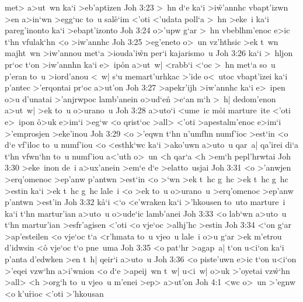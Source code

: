 met>
a>ut~wn
ka`i
>eb'aptizen\bibvsend
\vs Joh 3:23
>~hn
d`e
ka`i
>i\r{w}'annhc
vbapt'izwn
>en
a>in`wn
>egg`uc
to~u
sal\r{e}`im
<'oti
<'udata
poll`a
>~hn
>eke~i
ka`i
pareg'inonto
ka`i
>ebapt'izonto\bibvsend
\vs Joh 3:24
o>'upw
g`ar
>~hn
vbeblhm'enoc
e>ic
t`hn
vfulak`hn
<o
>iw'annhc\bibvsend
\vs Joh 3:25
>eg'eneto
o>~un
vz'hthsic
>ek
t~wn
majht~wn
>iw'annou
met`a
>iouda'i\r{w}n
per`i
kajarismo~u\bibvsend
\vs Joh 3:26
ka`i
>~hljon
pr`oc
t`on
>iw'annhn
ka`i
e>~ip\r{o}n
a>ut~w|
<rabb`i
<`oc
>~hn
met`a
so~u
p'eran
to~u
>iord'anou
<~w|
s`u
memart'urhkac
>'ide
o<~utoc
vbapt'izei
ka`i
p'antec
>'erqontai
pr`oc
a>ut'on\bibvsend
\vs Joh 3:27
>apekr'ijh
>iw'annhc
ka`i
e>~ipen
o>u
d'unatai
>'anjrwpoc
lamb'anein
o>ud`e\r{n}
>e`an
m`h
>~h|
dedom'enon
a>ut~w|
>ek
to~u
o>urano~u\bibvsend
\vs Joh 3:28
a>uto`i
<ume~ic
m\r{o}i
marture~ite
<'oti
e>~ipon
\r{o}>uk
e>im`i
>eg`w
<o
qrist`oc
>all>
<'oti
>apestalm'enoc
e>im`i
>'emprosjen
>eke'inou\bibvsend
\vs Joh 3:29
<o
>'eqwn
t`hn
n'umfhn
numf'ioc
>est`in
<o
d`e
vf'iloc
to~u
numf'iou
<o
<esthk`wc
ka`i
>ako'uwn
a>uto~u
qar~a|
qa'irei
di`a
t`hn
vfwn`hn
to~u
numf'iou
a<'uth
o>~un
<h
qar`a
<h
>em`h
pepl'hrwtai\bibvsend
\vs Joh 3:30
>eke~inon
de~i
a>ux'anein
>em`e
d`e
>elatto~usjai\bibvsend
\vs Joh 3:31
<o
>'anwjen
>erq'omenoc
>ep'anw
p'antwn
>est`in
<o
>`wn
>ek
t~hc
g~hc
>ek
t~hc
g~hc
>estin
ka`i
>ek
t~hc
g~hc
lale~i
<o
>ek
to~u
o>urano~u
>erq'omenoc
>ep'anw
p'antwn
>est'in\bibvsend
\vs Joh 3:32
k\r{a}`i
<`o
<e'wraken
ka`i
>'hkousen
to~uto
marture~i
ka`i
t`hn
martur'ian
a>uto~u
o>ude`ic
lamb'anei\bibvsend
\vs Joh 3:33
<o
lab`wn
a>uto~u
t`hn
martur'ian
>esfr'agisen
<'oti
<o
vje`oc
>alhj'hc
>estin\bibvsend
\vs Joh 3:34
<`on
g`ar
>ap'esteilen
<o
vje`oc
t`a
<r'hmata
to~u
vjeo~u
lale~i
o>u
g`ar
>ek
m'etrou
d'idwsin
<o\r{}
vje`oc
t`o
pne~uma\bibvsend
\vs Joh 3:35
<o
pat`hr
>agap~a|
t`on
u<i`on
ka`i
p'anta
d'edwken
>en
t~h|
qeir`i
a>uto~u\bibvsend
\vs Joh 3:36
<o
piste'uwn
e>ic
t`on
u<i`on
>'eqei
vzw`hn
a>i'wnion
<o
d`e
>apeij~wn
t~w|
u<i~w|
o>uk
>'oyetai
vz\r{w}`hn
>all>
<h
>org`h
to~u
vjeo~u
m'enei
>ep>
a>ut'on\bibvsend
\vs Joh 4:1
<wc
o>~un
>'egnw
<o
k'u\r{r}ioc
<'oti
>'hkousan
